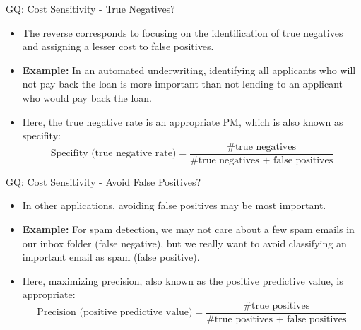 \documentclass[11pt,compress,t,notes=noshow, aspectratio=169, xcolor=table]{beamer}
\begin{document}

\begin{frame}{GQ: Cost Sensitivity - True Negatives?}
    \begin{itemize}
        \setlength\itemsep{2em}
        \item The reverse corresponds to focusing on the identification of true negatives and assigning a lesser cost to false positives.
        \item \textbf{Example:} In an automated underwriting, identifying all applicants who will not pay back the loan is more important than not lending to an applicant who would pay back the loan.
        \item Here, the true negative rate is an appropriate PM, which is also known as  specifity:
            $$
                \text{Specifity (true negative rate)} = \frac{\text{\# true negatives}}{\text{\# true negatives + false positives}}
            $$
    \end{itemize}
\end{frame}


\begin{frame}{GQ: Cost Sensitivity - Avoid False Positives?}
    \begin{itemize}
        \setlength\itemsep{2em}
        \item In other applications, avoiding false positives may be most important.
        \item \textbf{Example:} For spam detection, we may not care about a few spam emails in our inbox folder (false negative), but we really want to avoid classifying an important email as spam (false positive).
        \item Here, maximizing precision, also known as the positive predictive value, is appropriate:
        $$
            \text{Precision (positive predictive value)} = \frac{\text{\# true positives}}{\text{\# true positives + false positives}}
        $$
    \end{itemize}
\end{frame}
\end{document}

